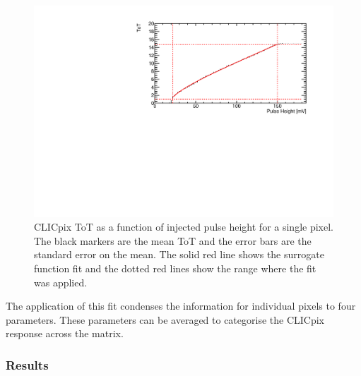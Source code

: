 \begin{figure}
\centering
\includegraphics[width=1.0\textwidth]{CLICdpVertex/Plots/TestPulseCalibration/Fits/Set9/ToT_PulseHeight_Set_9_ChipID_001ec0db94b1_Pixel_x0_y0_Fit.pdf}
\caption[CLICpix ToT as a function of injected pulse height.]{CLICpix ToT as a function of injected pulse height for a single pixel.  The black markers are the mean ToT and the error bars are the standard error on the mean.  The solid red line shows the surrogate function fit and the dotted red lines show the range where the fit was applied.}
\label{fig:testpulseexamplefit}
\end{figure}

The application of this fit condenses the information for individual pixels to four parameters.  These parameters can be averaged to categorise the CLICpix response across the matrix.  


\subsubsection{Results}
\label{sec:testpulsecalibrationresults}

